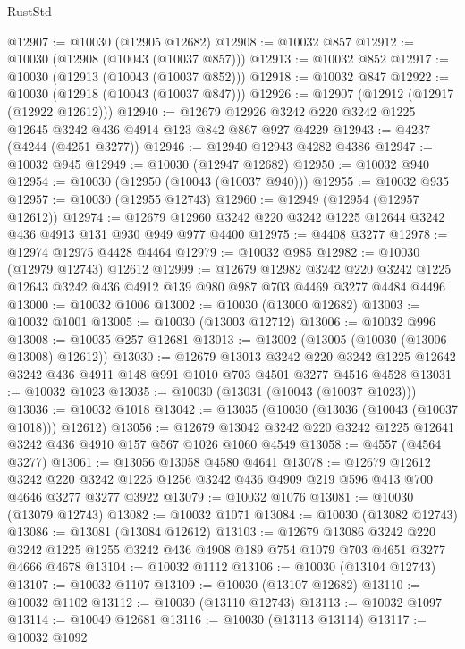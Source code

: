 \begin{lexlean}{RustStd}
\begin{coremodule}
@12907 := @10030 (@12905 @12682)
@12908 := @10032 @857
@12912 := @10030 (@12908 (@10043 (@10037 @857)))
@12913 := @10032 @852
@12917 := @10030 (@12913 (@10043 (@10037 @852)))
@12918 := @10032 @847
@12922 := @10030 (@12918 (@10043 (@10037 @847)))
@12926 := @12907 (@12912 (@12917 (@12922 @12612)))
@12940 := @12679 @12926 @3242 @220 @3242 @1225 @12645 @3242 @436 @4914 @123 @842 @867 @927 @4229
@12943 := @4237 (@4244 (@4251 @3277))
@12946 := @12940 @12943 @4282 @4386
@12947 := @10032 @945
@12949 := @10030 (@12947 @12682)
@12950 := @10032 @940
@12954 := @10030 (@12950 (@10043 (@10037 @940)))
@12955 := @10032 @935
@12957 := @10030 (@12955 @12743)
@12960 := @12949 (@12954 (@12957 @12612))
@12974 := @12679 @12960 @3242 @220 @3242 @1225 @12644 @3242 @436 @4913 @131 @930 @949 @977 @4400
@12975 := @4408 @3277
@12978 := @12974 @12975 @4428 @4464
@12979 := @10032 @985
@12982 := @10030 (@12979 @12743) @12612
@12999 := @12679
    @12982
    @3242
    @220
    @3242
    @1225
    @12643
    @3242
    @436
    @4912
    @139
    @980
    @987
    @703
    @4469
    @3277
    @4484
    @4496
@13000 := @10032 @1006
@13002 := @10030 (@13000 @12682)
@13003 := @10032 @1001
@13005 := @10030 (@13003 @12712)
@13006 := @10032 @996
@13008 := @10035 @257 @12681
@13013 := @13002 (@13005 (@10030 (@13006 @13008) @12612))
@13030 := @12679
    @13013
    @3242
    @220
    @3242
    @1225
    @12642
    @3242
    @436
    @4911
    @148
    @991
    @1010
    @703
    @4501
    @3277
    @4516
    @4528
@13031 := @10032 @1023
@13035 := @10030 (@13031 (@10043 (@10037 @1023)))
@13036 := @10032 @1018
@13042 := @13035 (@10030 (@13036 (@10043 (@10037 @1018))) @12612)
@13056 := @12679 @13042 @3242 @220 @3242 @1225 @12641 @3242 @436 @4910 @157 @567 @1026 @1060 @4549
@13058 := @4557 (@4564 @3277)
@13061 := @13056 @13058 @4580 @4641
@13078 := @12679
    @12612
    @3242
    @220
    @3242
    @1225
    @1256
    @3242
    @436
    @4909
    @219
    @596
    @413
    @700
    @4646
    @3277
    @3277
    @3922
@13079 := @10032 @1076
@13081 := @10030 (@13079 @12743)
@13082 := @10032 @1071
@13084 := @10030 (@13082 @12743)
@13086 := @13081 (@13084 @12612)
@13103 := @12679
    @13086
    @3242
    @220
    @3242
    @1225
    @1255
    @3242
    @436
    @4908
    @189
    @754
    @1079
    @703
    @4651
    @3277
    @4666
    @4678
@13104 := @10032 @1112
@13106 := @10030 (@13104 @12743)
@13107 := @10032 @1107
@13109 := @10030 (@13107 @12682)
@13110 := @10032 @1102
@13112 := @10030 (@13110 @12743)
@13113 := @10032 @1097
@13114 := @10049 @12681
@13116 := @10030 (@13113 @13114)
@13117 := @10032 @1092

\end{coremodule}
\end{lexlean}
